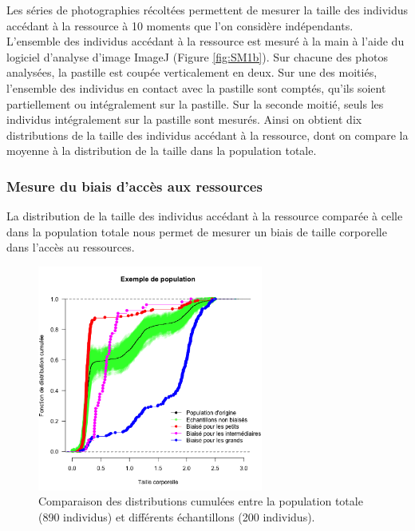 Les séries de photographies récoltées permettent de mesurer la taille des
individus accédant à la ressource à 10 moments que l'on considère indépendants.
L'ensemble des individus accédant à la ressource est mesuré à la main à l'aide
du logiciel d'analyse d'image ImageJ (Figure \ref{fig:SM1b}). Sur chacune des
photos analysées, la pastille est coupée verticalement en deux. Sur une des moitiés, l'ensemble des
individus en contact avec la pastille sont comptés, qu'ils soient partiellement
ou intégralement sur la pastille. Sur la seconde moitié, seuls les individus
intégralement sur la pastille sont mesurés. Ainsi on obtient dix distributions
de la taille des individus accédant à la ressource, dont on compare la moyenne à
la distribution de la taille dans la population totale.

\subsubsection{Mesure du biais d'accès aux ressources}

La distribution de la taille des individus accédant à la ressource comparée à
celle dans la population totale nous permet de mesurer un biais de taille
corporelle dans l'accès au ressources.

\begin{figure}[!ht]
\begin{center}
\includegraphics[width=0.66\textwidth]{1_CorpsDeThese/Resumes/Fig/SM02}
\caption[Comparaison des
distributions cumulées]{Comparaison des distributions cumulées entre la
population totale (890 individus) et différents échantillons (200 individus).
}
\label{fig:SM2}
\end{center}
\end{figure}

